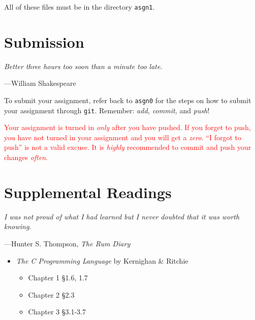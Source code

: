 \documentclass{article}
\newcommand\asgn[1]{asgn#1}
\begin{document}
All of these files must be in the directory \texttt{\asgn{1}}.


\section{Submission}
\textwidth
\epigraph{\emph{Better three hours too soon than a minute too
late.}}{---William Shakespeare}

To submit your assignment, refer back to \texttt{\asgn{0}} for the steps on how to submit your assignment through \texttt{git}. Remember: \emph{add, commit,} and \emph{push}!

\textcolor{red}{Your assignment is turned in \emph{only} after you have pushed.
If you forget to push, you have not turned in your assignment and you will get
a \emph{zero}. ``I forgot to push'' is not a valid excuse. It is \emph{highly} recommended to commit and push your changes \emph{often}.}

\section{Supplemental Readings}
\epigraph{\emph{I was not proud of what I had learned but I never doubted that it was worth knowing.}}{---Hunter S. Thompson, \emph{The Rum Diary}}\noindent

 \begin{itemize}

 	\item \textit{The C Programming Language} by Kernighan \& Ritchie
	\begin{itemize}
		\item Chapter 1 \S 1.6, 1.7
		\item Chapter 2 \S 2.3
		\item Chapter 3 \S 3.1-3.7
	\end{itemize}
 \end{itemize}



\end{document}
